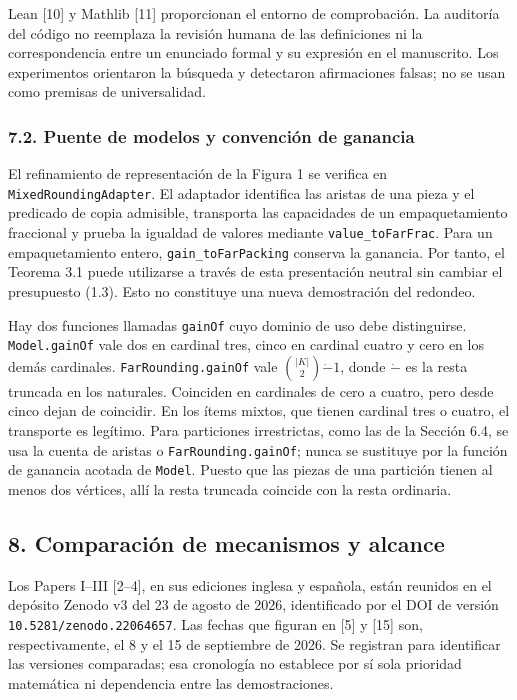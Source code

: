 \documentclass[spanish,11pt,a4paper]{article}
\begin{document}
Lean {[}10{]} y Mathlib {[}11{]} proporcionan el entorno de comprobación. La auditoría del código no reemplaza la revisión humana de las definiciones ni la correspondencia entre un enunciado formal y su expresión en el manuscrito. Los experimentos orientaron la búsqueda y detectaron afirmaciones falsas; no se usan como premisas de universalidad.

\subsubsection{7.2. Puente de modelos y convención de ganancia}\label{puente-de-modelos-y-convenciuxf3n-de-ganancia}

El refinamiento de representación de la Figura 1 se verifica en \nolinkurl{MixedRoundingAdapter}. El adaptador identifica las aristas de una pieza y el predicado de copia admisible, transporta las capacidades de un empaquetamiento fraccional y prueba la igualdad de valores mediante \nolinkurl{value_toFarFrac}. Para un empaquetamiento entero, \nolinkurl{gain_toFarPacking} conserva la ganancia. Por tanto, el Teorema 3.1 puede utilizarse a través de esta presentación neutral sin cambiar el presupuesto (1.3). Esto no constituye una nueva demostración del redondeo.

Hay dos funciones llamadas \nolinkurl{gainOf} cuyo dominio de uso debe distinguirse. \nolinkurl{Model.gainOf} vale dos en cardinal tres, cinco en cardinal cuatro y cero en los demás cardinales. \nolinkurl{FarRounding.gainOf} vale \(\binom{|K|}{2}\mathbin{\dot-}1\), donde \(\dot-\) es la resta truncada en los naturales. Coinciden en cardinales de cero a cuatro, pero desde cinco dejan de coincidir. En los ítems mixtos, que tienen cardinal tres o cuatro, el transporte es legítimo. Para particiones irrestrictas, como las de la Sección 6.4, se usa la cuenta de aristas o \nolinkurl{FarRounding.gainOf}; nunca se sustituye por la función de ganancia acotada de \nolinkurl{Model}. Puesto que las piezas de una partición tienen al menos dos vértices, allí la resta truncada coincide con la resta ordinaria.

\subsection{8. Comparación de mecanismos y alcance}\label{comparaciuxf3n-de-mecanismos-y-alcance}

Los Papers I--III {[}2--4{]}, en sus ediciones inglesa y española, están reunidos en el depósito Zenodo v3 del 23 de agosto de 2026, identificado por el DOI de versión \nolinkurl{10.5281/zenodo.22064657}. Las fechas que figuran en {[}5{]} y {[}15{]} son, respectivamente, el 8 y el 15 de septiembre de 2026. Se registran para identificar las versiones comparadas; esa cronología no establece por sí sola prioridad matemática ni dependencia entre las demostraciones.
\end{document}
